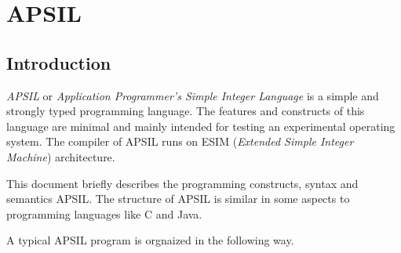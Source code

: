 %
%
%
%
%
%
%
\chapter{APSIL}


\thispagestyle{plain}



\section{Introduction}
\textit{APSIL} or \textit{Application Programmer's Simple Integer Language} is a simple and strongly typed programming language. The features and constructs of this language are minimal and mainly intended for testing an experimental operating system. The compiler of APSIL runs on ESIM (\textit{Extended Simple Integer Machine}) architecture.

This document briefly describes the programming constructs, syntax and semantics APSIL. The structure of APSIL is similar in some aspects to programming languages like C and Java. 

A typical APSIL program is orgnaized in the following way. 

